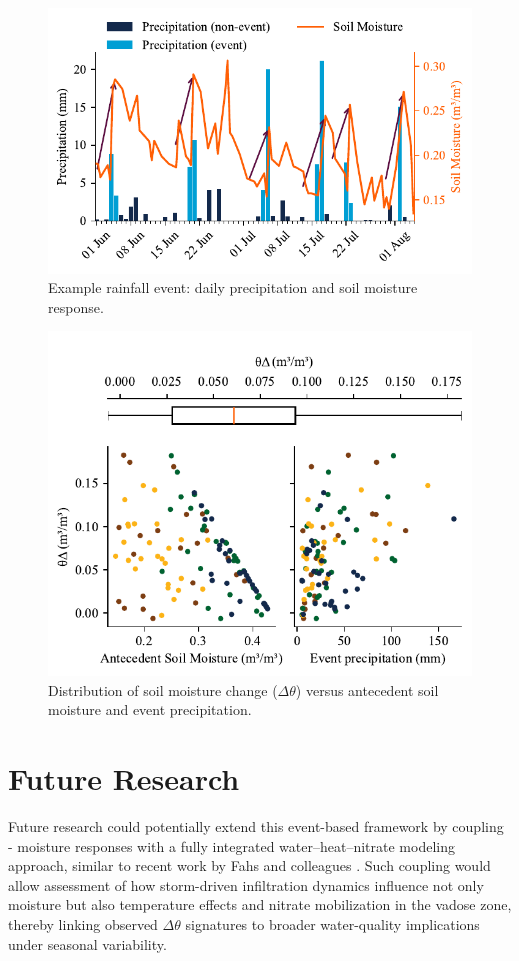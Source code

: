 \documentclass[twocolumn]{article}
\begin{document}
\begin{figure}[!h]
    \centering
    \includegraphics[width=\columnwidth]{sample events}
    \caption{Example rainfall event: daily precipitation and soil moisture response.}
    \label{fig:sample_events}
\end{figure}

\begin{figure}[!h]
    \centering
    \includegraphics[width=\columnwidth]{dt events}
    \caption{Distribution of soil moisture change ($\Delta \theta$) versus antecedent soil moisture and event precipitation.}
    \label{fig:dt_events}
\end{figure}


\section*{Future Research}

Future research could potentially extend this event-based framework by coupling - moisture responses with a fully integrated water–heat–nitrate modeling approach, similar to recent work by Fahs and colleagues \cite{Fahs2025}. Such coupling would allow assessment of how storm-driven infiltration dynamics influence not only moisture but also temperature effects and nitrate mobilization in the vadose zone, thereby linking observed $\Delta \theta$ signatures to broader water-quality implications under seasonal variability.

\printbibliography
\end{document}
